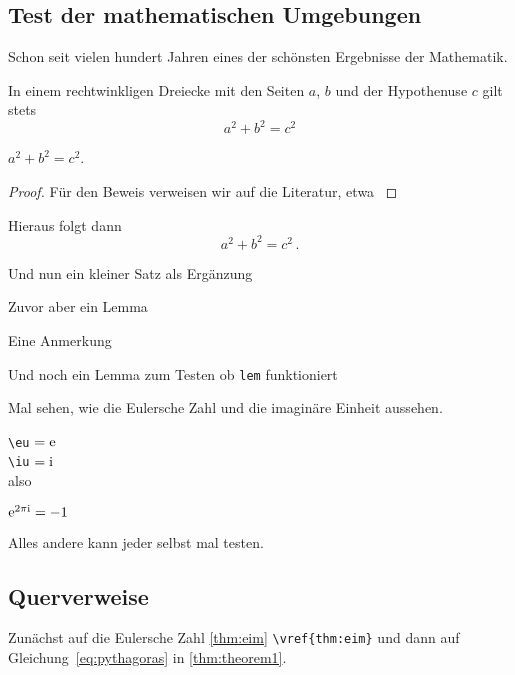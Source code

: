 \subsection{Test der mathematischen Umgebungen}\label{subsec:mumgebungen}
Schon seit vielen hundert Jahren eines der schönsten Ergebnisse der Mathematik.
%
\begin{theorem}\label{thm:theorem1}
In einem rechtwinkligen Dreiecke mit den Seiten $ a $, $ b $ und der Hypothenuse $ c $ gilt stets
\begin{equation}\label{eq:pythagoras}
a^{ 2 } +b^{ 2 } = c^{ 2 }
\end{equation}

$	a^{ 2 } +b^{ 2 } = c^{ 2 } $.
\end{theorem}
%
\begin{proof}
Für den Beweis verweisen wir auf die Literatur, etwa \textcite{efhn:2016}
\end{proof}
\begin{corollary}\label{cor:folgerung}
Hieraus folgt dann 
%
\[
	a^{ 2 } + b^{ 2 } = c^{ 2 } \, .
\]
%
\end{corollary}
%
\begin{proposition}\label{prop:prop}
Und nun ein kleiner Satz als Ergänzung 
\end{proposition}
%
\begin{lemma}\label{lem:lemma1}
Zuvor aber ein Lemma
\end{lemma}
%
\begin{remark}\label{rem:remark}
Eine Anmerkung
\end{remark}
\begin{lem}\label{lem:lemma2}
Und noch ein Lemma zum Testen ob \texttt{lem} funktioniert
\end{lem}
Mal sehen, wie die Eulersche Zahl und die imaginäre Einheit aussehen.

\verb|\eu| $=\mathrm{e}$ \\
\verb|\iu| $=\mathrm{i}$ \\
also 
\begin{theorem}\label{thm:eim}
$ \mathrm{e}^{ 2 \pi \mathrm{i} } = -1 $
\end{theorem}
Alles andere kann jeder selbst mal testen.
%
\subsection{Querverweise}\label{subsec:referenzen}
%
Zunächst auf die Eulersche Zahl \vref{thm:eim} \verb|\vref{thm:eim}| und dann auf Gleichung~\eqref{eq:pythagoras} in \vref{thm:theorem1}.


